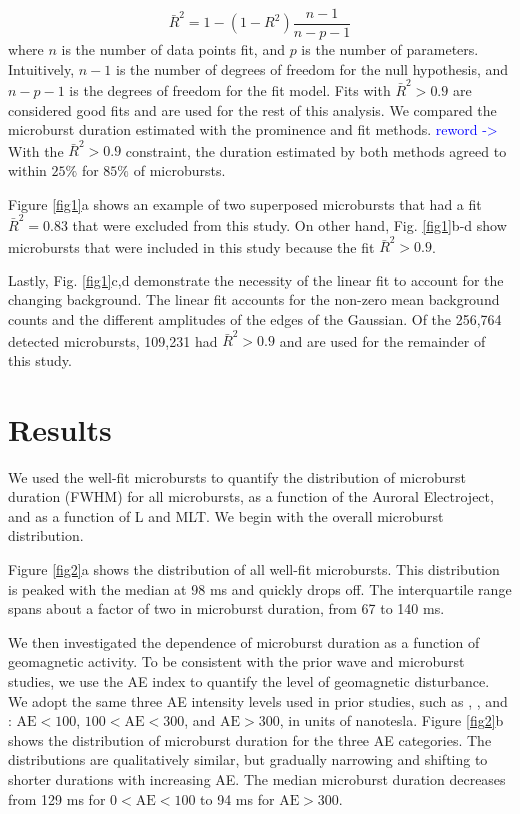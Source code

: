 \documentclass[draft]{agujournal2019}
\begin{document}
\begin{equation}
\bar{R}^2 = 1 - (1-R^2) \frac{n-1}{n-p-1}
\end{equation} where $n$ is the number of data points fit, and $p$ is the number of parameters. Intuitively, $n-1$ is the number of degrees of freedom for the null hypothesis, and $n-p-1$ is the degrees of freedom for the fit model. Fits with $\bar{R}^2 > 0.9$ are considered good fits and are used for the rest of this analysis. We compared the microburst duration estimated with the prominence and fit methods. \textcolor{blue}{reword ->} With the $\bar{R}^2 > 0.9$ constraint, the duration estimated by both methods agreed to within $25\%$ for $85\%$ of microbursts.

Figure \ref{fig1}a shows an example of two superposed microbursts that had a fit $\bar{R}^2 = 0.83$ that were excluded from this study. On other hand, Fig. \ref{fig1}b-d show microbursts that were included in this study because the fit $\bar{R}^2 > 0.9$.

Lastly, Fig. \ref{fig1}c,d demonstrate the necessity of the linear fit to account for the changing background. The linear fit accounts for the non-zero mean background counts and the different amplitudes of the edges of the Gaussian. Of the 256,764 detected microbursts, 109,231 had $\bar{R}^2 > 0.9$ and are used for the remainder of this study.

\section{Results}\label{results}
We used the well-fit microbursts to quantify the distribution of microburst duration (FWHM) for all microbursts, as a function of the Auroral Electroject, and as a function of L and MLT. We begin with the overall microburst distribution.

Figure \ref{fig2}a shows the distribution of all well-fit microbursts. This distribution is peaked with the median at 98 ms and quickly drops off. The interquartile range spans about a factor of two in microburst duration, from 67 to 140 ms. 

We then investigated the dependence of microburst duration as a function of geomagnetic activity. To be consistent with the prior wave and microburst studies, we use the AE index to quantify the level of geomagnetic disturbance. We adopt the same three AE intensity levels used in prior studies, such as , , and : $\mathrm{AE} < 100$, $100 < \mathrm{AE} < 300$, and $\mathrm{AE} > 300$, in units of nanotesla. Figure \ref{fig2}b shows the distribution of microburst duration for the three AE categories. The distributions are qualitatively similar, but gradually narrowing and shifting to shorter durations with increasing AE. The median microburst duration decreases from 129 ms for $0 < \mathrm{AE} < 100$ to 94 ms for $ \mathrm{AE} > 300$.
\end{document}
